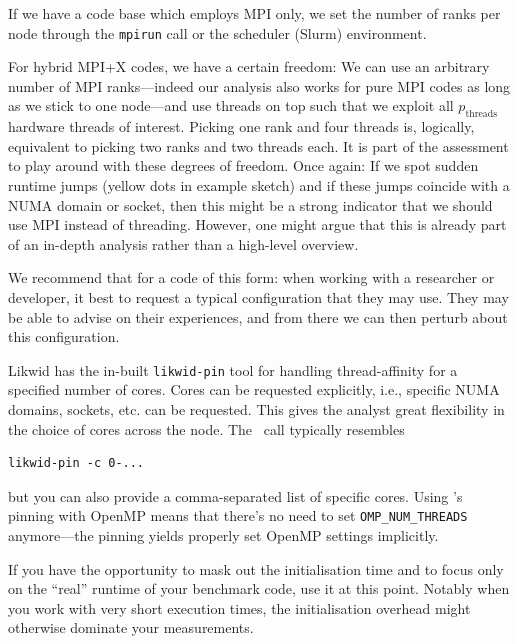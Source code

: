 \begin{instructions}{\mpi}
If we have a code base which employs MPI only, we set the number of ranks per
node through the \texttt{mpirun} call or the scheduler (Slurm) environment.

For hybrid MPI+X codes, we have a certain freedom:
We can use an arbitrary number of MPI ranks---indeed our analysis also works for pure MPI codes as long as we stick to one node---and use threads on top such that we exploit all $p_{\text{threads}}$ hardware threads of interest.
Picking one rank and four threads is, logically, equivalent to picking two ranks and two threads each.
It is part of the assessment to play around with these degrees of freedom.
Once again: If we spot sudden runtime jumps (yellow dots in example sketch) and if these jumps coincide with a NUMA domain or socket, then this might be a strong indicator that we should use MPI instead of threading.
However, one might argue that this is already part of an in-depth analysis rather than a high-level overview.

We recommend that for a code of this form: when working with a researcher or developer, it best to request a typical configuration that they may use. They may be able to advise on their experiences, and from there we can then perturb about this configuration.
\end{instructions}

\begin{instructions}{\likwid}
Likwid has the in-built \texttt{likwid-pin} tool for handling thread-affinity for a specified number of cores. 
Cores can be requested explicitly, i.e., specific NUMA domains, sockets, etc. can be requested. 
This gives the analyst great flexibility in the choice of cores across the node.
The \likwid~call typically resembles
\begin{verbatim}
likwid-pin -c 0-...
\end{verbatim}
but you can also provide a comma-separated list of specific cores.
Using \likwid's pinning with OpenMP means that there's no need to set \texttt{OMP\_NUM\_THREADS} anymore---the pinning yields properly set OpenMP settings implicitly.
\end{instructions}

\noindent
 If you have the opportunity to mask out the initialisation time and to focus
 only on the ``real'' runtime of your benchmark code, use it at this point.
 Notably when you work with very short execution times, the initialisation
 overhead might otherwise dominate your measurements.


